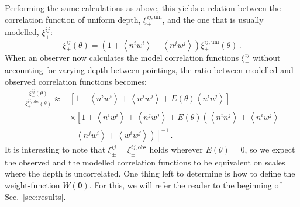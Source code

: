 \documentclass{aa}
\renewcommand{\rm}{\mathrm}
\def\inv{^{-1}}
\def\b#1{\bm{#1}}
\def\la{\left<}
\def\ra{\right>}
\begin{document}
 Performing the same calculations as above, this yields a relation between the correlation function of uniform depth, $\xi_\pm^{ij,\rm{uni}}$, and the one that is usually modelled, $\xi_\pm^{ij}$:
\begin{equation}
\xi_\pm^{ij}(\theta) = \left(1+\la n^iw^i\ra + \la n^jw^j\ra \right)\xi_\pm^{ij,\rm{uni}}(\theta)\, .
\end{equation}
When an observer now calculates the model correlation functions $\xi^{ij}_\pm$ without accounting for varying depth between pointings, the ratio between modelled and observed correlation functions becomes: \begin{align}
\frac{\xi^{ij}_\pm(\theta)}{\xi_\pm^{ij,\rm{obs}}(\theta)} \approx &  \left[1+\la n^iw^i\ra +\la n^jw^j\ra + E(\theta)\la n^in^j\ra\right] \nonumber\\
& \times \left[1 + \la n^iw^i\ra + \la n^jw^j\ra + E(\theta)\left(\la n^in^j\ra + \la n^iw^j\ra \right.\right. \nonumber\\
& \left.\left. + \la n^j w^i\ra + \la w^iw^j\ra\right)\right]\inv
\, .
\label{eq:xipm_analytic}
\end{align}
It is interesting to note that $\xi^{ij}_\pm = \xi_\pm^{ij,\rm{obs}}$ holds wherever $E(\theta)=0$, so we expect the observed and the modelled correlation functions to be equivalent on scales where the depth is uncorrelated. One thing left to determine is how to define the weight-function $W(\b\theta)$. For this, we will refer the reader to the beginning of Sec.~\ref{sec:results}.


\end{document}
